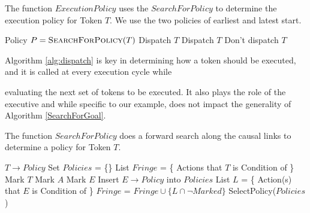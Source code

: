 
\begin{algorithm} [H]
  \caption{\small The function $ExecutionPolicy$ uses the
    $SearchForPolicy$ to determine the execution policy for Token
    $T$. We use the two policies of earliest and latest start.}
  \label{alg:dispatch}
\label{ExecutionPolicy}
\begin{algorithmic}
\small 
{}
\State Policy $P = \textsc{SearchForPolicy}( T )$
	\State \Return Dispatch $T$
	\State \Return Dispatch $T$
\Else
	\State \Return Don't dispatch $T$
\EndIf
\EndFunction
\end{algorithmic}
\end{algorithm}

Algorithm \ref{alg:dispatch} is key in determining how a token should
be executed, and it is called at every execution cycle while

evaluating the next set of tokens to be executed. It also plays the
role of the executive and while specific to our example, does not
impact the generality of Algorithm \ref{SearchForGoal}.


\begin{algorithm} [htb]
  \caption{\small The function $SearchForPolicy$ does a forward search
    along the causal links to determine a policy for Token $T$.}
  \label{SearchForGoal}
\begin{algorithmic}
  \small
  \State \Return $T \to Policy$
  \Else 
  \State Set $Policies$ = \{\}
  \State List $Fringe$ = \{ Actions that $T$ is Condition of \}
  \State Mark $T$
  \State Mark $A$
  \State Mark $E$
  \State Insert $E \to Policy$ into $Policies$
  \EndIf
  \State List $L$ = \{ Action(s) that $E$ is Condition of \}
  \State $Fringe$ = $Fringe \cup \{L \cap \neg Marked \}$ 
  \EndFor
  \EndFor
  \EndIf
  \State \Return SelectPolicy($Policies$)
\EndFunction
\end{algorithmic}
\end{algorithm}


